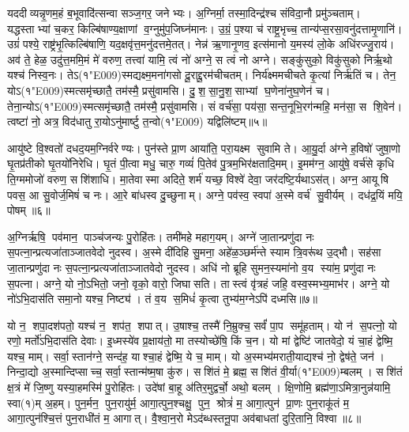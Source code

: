 यददीव्यन्नृ॒णम॒हं ब॒भूवादि॑त्सन्वा सञ्ज॒गर॒ जनेभ्यः। अ॒ग्निर्मा॒ तस्मा॒दिन्द्र॑श्च संविदा॒नौ प्रमु॑ञ्चताम्। यद्धस्ताभ्यां च॒कर॒ किल्बि॑षाण्य॒क्षाणां व॒ग्नुमु॑प॒जिघ्न॑मानः। उ॒ग्रं॒ प॒श्या च॑ राष्ट्र॒भृच्च॒ तान्य॑प्स॒रसा॒वनु॑दत्तामृ॒णानि॑। उग्रं॑ पश्ये॒ राष्ट्र॑भृ॒त्किल्बि॑षाणि॒ यद॒क्षवृ॑त्त॒मनु॑दत्तमे॒तत्। नेन्न॑ ऋ॒णानृ॒णव॒ इत्स॑मानो य॒मस्य॑ लो॒के अधि॑रज्जु॒राय॑। अव॑ ते॒ हेळ॒ उदु॑त्त॒ममि॒मं मे॑ वरुण॒ तत्त्वा॑ यामि॒ त्वं नो॑ अग्ने॒ स त्वं नो अग्ने। सङ्कु॑सुको॒ विकु॑सुको निर्\mbox{}ऋ॒थो यश्च॑ निस्व॒नः। तेऽ(१\char"E009)स्मद्यक्ष्म॒मना॑गसो दू॒राद्दू॒रम॑चीचतम्। निर्य॑क्ष्ममचीचते कृ॒त्यां निर्\mbox{}ऋ॑तिं च। तेन॒ योऽ(१\char"E009)स्मत्समृ॑च्छातै॒ तम॑स्मै॒ प्रसु॑वामसि। दु॒श॒सा॒नु॒श॒साभ्यां घ॒णेना॑नुघ॒णेन॑ च। तेना॒न्योऽ(१\char"E009)स्मत्समृ॑च्छातै॒ तम॑स्मै॒ प्रसु॑वामसि। सं वर्च॑सा॒ पय॑सा॒ सन्त॒नूभि॒रग॑न्महि॒ मन॑सा॒ स शि॒वेन॑। त्वष्टा॑ नो॒ अत्र॒ विद॑धातु रा॒योऽनु॑मार्ष्टु त॒न्वो(१\char"E009) यद्विलि॑ष्टम्॥५॥\anuvakamend


आयु॑ष्टे वि॒श्वतो॑ दधद॒यम॒ग्निर्वरेण्यः। पुन॑स्ते प्रा॒ण आया॑ति॒ परा॒यक्ष्म सुवामि ते। आ॒यु॒र्दा अ॑ग्ने ह॒विषो॑ जुषा॒णो घृ॒तप्र॑तीको घृ॒तयो॑निरेधि। घृ॒तं पी॒त्वा मधु॒ चारु॒ गव्यं॑ पि॒तेव॑ पु॒त्रम॒भिर॑क्षतादि॒मम्। इ॒मम॑ग्न॒ आयु॑षे॒ वर्च॑से कृधि ति॒ग्ममोजो॑ वरुण॒ सशि॑शाधि। मा॒तेवास्मा अदिते॒ शर्म॑ यच्छ॒ विश्वे॑ देवा॒ जर॑दष्टि॒र्यथाऽस॑त्। अग्न॒ आयूषि पवस॒ आ सु॒वोर्ज॒मिषं॑ च नः। आ॒रे बा॑धस्व दु॒च्छुनाम्। अग्ने॒ पव॑स्व॒ स्वपा॑ अ॒स्मे वर्च॑ सु॒वीर्यम्। दध॑द्र॒यिं मयि॒ पोषम्॥६॥

अ॒ग्निर्\mbox{}ऋषि॒ पव॑मान॒ पाञ्च॑जन्यः पु॒रोहि॑तः। तमी॑महे महाग॒यम्। अग्ने॑ जा॒तान्प्रणु॑दा नः स॒पत्ना॒न्प्रत्यजा॑ताञ्जातवेदो नुदस्व। अ॒स्मे दी॑दिहि सु॒मना॒ अहे॑ळ॒ञ्छर्म॑न्ते स्याम त्रि॒वरू॑थ उ॒द्भौ। सह॑सा जा॒तान्प्रणु॑दा नः स॒पत्ना॒न्प्रत्यजा॑ताञ्जातवेदो नुदस्व। अधि॑ नो ब्रूहि सुमन॒स्यमा॑नो व॒य स्या॑म॒ प्रणु॑दा नः स॒पत्ना\sn{}। अग्ने॒ यो नो॒ऽभितो॒ जनो॒ वृको॒ वारो॒ जिघासति। तास्त्वं वृ॑त्रहं जहि॒ वस्व॒स्मभ्य॒माभ॑र। अग्ने॒ यो नो॑ऽभि॒दास॑ति समा॒नो यश्च॒ निष्ट्य॑। तं व॒य स॒मिधं॑ कृ॒त्वा तुभ्य॑म॒ग्नेऽपि॑ दध्मसि॥७॥

यो न॒ शपा॒दश॑पतो॒ यश्च॑ न॒ शप॑त॒ शपात्। उ॒षाश्च॒ तस्मै॑ नि॒म्रुक्च॒ सर्वं॑ पा॒प समू॑हताम्। यो न॑ स॒पत्नो॒ यो रणो॒ मर्तो॑ऽभि॒दास॑ति देवाः। इ॒ध्मस्ये॑व प्र॒क्षाय॑तो॒ मा तस्योच्छे॑षि॒ किं च॒न। यो मां द्वेष्टि॑ जातवेदो॒ यं चा॒हं द्वेष्मि॒ यश्च॒ माम्। सर्वा॒स्तान॑ग्ने॒ सन्द॑ह॒ याश्चा॒हं द्वेष्मि॒ ये च॒ माम्। यो अ॒स्मभ्य॑मराती॒याद्यश्च॑ नो॒ द्वेष॑ते॒ जन॑। निन्दा॒द्यो अ॒स्मान्दिप्साच्च॒ सर्वा॒स्तान्म॑ष्म॒षा कु॑रु। सशि॑तं मे॒ ब्रह्म॒ सशि॑तं वी॒र्या(१\char"E009)म्बलम्। सशि॑तं क्ष॒त्रं मे॑ जि॒ष्णु यस्या॒हमस्मि॑ पु॒रोहि॑तः। उदे॑षां बा॒हू अ॑तिर॒मुद्वर्चो॒ अथो॒ बलम्। क्षि॒णोमि॒ ब्रह्म॑णा॒ऽमित्रा॒नुन्न॑यामि॒ स्वा(१)म् अ॒हम्। पुन॒र्मन॒ पुन॒रायु॑र्म॒ आगा॒त्पुन॒श्चक्षु॒ पुन॒ श्रोत्रं॑ म॒ आगा॒त्पुन॑ प्रा॒णः पुन॒राकू॑तं म॒ आगा॒त्पुन॑श्चि॒त्तं पुन॒राधी॑तं म॒ आगात्। वै॒श्वा॒न॒रो मेऽद॑ब्धस्तनू॒पा अव॑बाधतां दुरि॒तानि॒ विश्वा॥८॥\anuvakamend

